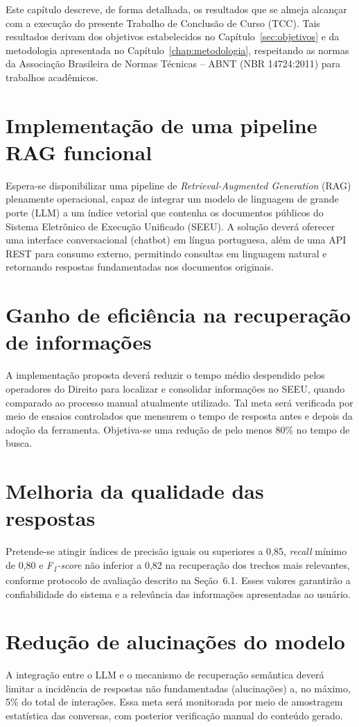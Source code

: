 Este capítulo descreve, de forma detalhada, os resultados que se almeja alcançar com a execução do presente Trabalho de Conclusão de Curso (TCC). Tais resultados derivam dos objetivos estabelecidos no Capítulo~\ref{sec:objetivos} e da metodologia apresentada no Capítulo~\ref{chap:metodologia}, respeitando as normas da Associação Brasileira de Normas Técnicas -- ABNT (NBR 14724:2011) para trabalhos acadêmicos.

\section{Implementação de uma pipeline RAG funcional}
Espera-se disponibilizar uma pipeline de \emph{Retrieval-Augmented Generation} (RAG) plenamente operacional, capaz de integrar um modelo de linguagem de grande porte (LLM) a um índice vetorial que contenha os documentos públicos do Sistema Eletrônico de Execução Unificado (SEEU). A solução deverá oferecer uma interface conversacional (chatbot) em língua portuguesa, além de uma API REST para consumo externo, permitindo consultas em linguagem natural e retornando respostas fundamentadas nos documentos originais.

\section{Ganho de eficiência na recuperação de informações}
A implementação proposta deverá reduzir o tempo médio despendido pelos operadores do Direito para localizar e consolidar informações no SEEU, quando comparado ao processo manual atualmente utilizado. Tal meta será verificada por meio de ensaios controlados que mensurem o tempo de resposta antes e depois da adoção da ferramenta. Objetiva-se uma redução de pelo menos 80\% no tempo de busca.

\section{Melhoria da qualidade das respostas}
Pretende-se atingir índices de precisão iguais ou superiores a 0,85, \emph{recall} mínimo de 0,80 e \emph{F\textsubscript{1}-score} não inferior a 0,82 na recuperação dos trechos mais relevantes, conforme protocolo de avaliação descrito na Seção~6.1. Esses valores garantirão a confiabilidade do sistema e a relevância das informações apresentadas ao usuário.

\section{Redução de alucinações do modelo}
A integração entre o LLM e o mecanismo de recuperação semântica deverá limitar a incidência de respostas não fundamentadas (alucinações) a, no máximo, 5\% do total de interações. Essa meta será monitorada por meio de amostragem estatística das conversas, com posterior verificação manual do conteúdo gerado.

